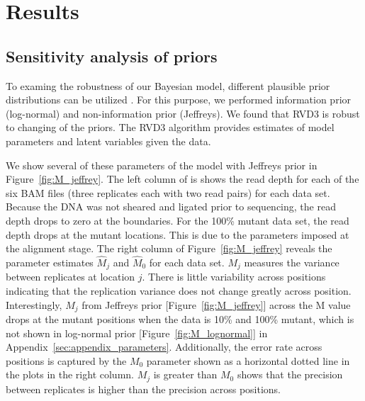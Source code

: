 \documentclass[11pt,reqno]{amsart}
\begin{document}
\section{Results}

\subsection{Sensitivity analysis of priors}
To examing the robustness of our Bayesian model, different plausible prior distributions can be utilized \citep{gelman2006prior}.
For this purpose, we performed information prior (log-normal) and non-information prior (Jeffreys).
We found that RVD3 is robust to changing of the priors. The RVD3 algorithm provides estimates of model parameters and latent variables given the data.

We show several of these parameters of the model with Jeffreys prior in Figure~\ref{fig:M_jeffrey}.
The left column of is shows the read depth for each of the six BAM files (three replicates each with two read pairs) for each data set.
Because the DNA was not sheared and ligated prior to sequencing, the read depth drops to zero at the boundaries. For the 100\% mutant data set, the read depth drops at the mutant locations.
This is due to the parameters imposed at the alignment stage.
The right column of Figure~\ref{fig:M_jeffrey} reveals the parameter estimates $\hat{M}_j$ and $\hat{M}_0$ for each data set. $M_j$ measures the variance between replicates at location $j$.
There is little variability across positions indicating that the replication variance does not change greatly across position.
Interestingly, $M_j$ from Jeffreys prior [Figure~\ref{fig:M_jeffrey}] across the M value drops at the mutant positions when the data is 10\% and 100\% mutant, which is not shown in log-normal prior [Figure~\ref{fig:M_lognormal}] in Appendix~\ref{sec:appendix_parameters}.
Additionally, the error rate across positions is captured by the $M_0$ parameter shown as a horizontal dotted line in the plots in the right column.
$M_j$ is greater than $M_0$ shows that the precision between replicates is higher than the precision across positions.
\end{document}
